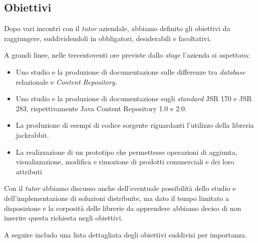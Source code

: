 		
	\subsection{Obiettivi}
		\label{sec:obiettivi}
	
	Dopo vari incontri con il \textit{tutor} aziendale, abbiamo definito gli obiettivi da raggiungere, suddividendoli in obbligatori, desiderabili e facoltativi.
	
	
	A grandi linee, nelle trecentoventi ore previste dallo \textit{stage} l'azienda si aspettava:
	\begin{itemize}
		\item Uno studio e la produzione di documentazione sulle differenze tra \textit{database} relazionale e \textit{Content Repository}.
		\item Uno studio e la produzione di documentazione sugli \textit{standard} JSR 170 e JSR 283, rispettivamente Java Content Repository 1.0 e 2.0.
		\item La produzione di esempi di codice sorgente riguardanti l'utilizzo della libreria \gls{jackrabbit}.
		\item La realizzazione di un prototipo che permettesse operazioni di aggiunta, visualizzazione, modifica e rimozione di prodotti commerciali e dei loro attributi
	\end{itemize}

	Con il \textit{tutor} abbiamo discusso anche dell'eventuale possibilità dello studio e dell'implementazione di soluzioni distribuite, ma dato il tempo limitato a disposizione e la corposità delle librerie da apprendere abbiamo deciso di non inserire questa richiesta negli obiettivi.
	
	
	A seguire includo una lista dettagliata degli obiettivi suddivisi per importanza.
	
